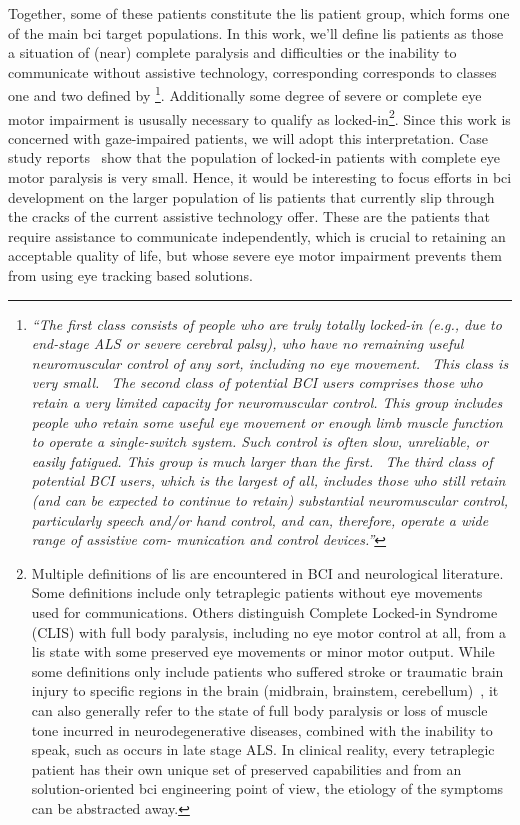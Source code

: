 \newcommand\fnlis{\footnote{
Multiple definitions of \ac{lis} are encountered in
BCI and neurological literature.
Some definitions include only tetraplegic patients without eye movements used
for communications.
Others distinguish Complete Locked-in Syndrome (CLIS) with full body paralysis,
including no eye motor control at all, from a \ac{lis} state with some preserved eye
movements or minor motor output.
While some definitions only include patients who suffered stroke or traumatic
brain injury to specific regions in the brain (midbrain, brainstem,
cerebellum)~\cite{Smith2005},
it can also generally refer to the state of full body paralysis
or loss of muscle tone incurred in neurodegenerative diseases, combined with
the inability to speak, such as occurs in late stage ALS.
In clinical reality, every tetraplegic patient has their own unique set of
preserved capabilities and from an solution-oriented \ac{bci} engineering point
of view, the etiology of the symptoms can be abstracted away.
}}

\newcommand\fnwolpawcrit{\footnote{
\it``The first class consists of people who are truly totally locked-in (e.g.,
due to end-stage ALS or severe cerebral palsy), who have no remaining
useful neuromuscular control of any sort, including no eye movement.
\elide\ This class is very small. \elide\
The second class of potential BCI users comprises those who retain
a very limited capacity for neuromuscular control. This group includes
people who retain some useful eye movement or enough limb muscle
function to operate a single-switch system. Such control is often slow,
unreliable, or easily fatigued.
This group is much larger than the first.
\elide\
The third class of potential BCI users, which is the largest of all,
includes those who still retain (and can be expected to continue to
retain) substantial neuromuscular control, particularly speech and/or
hand control, and can, therefore, operate a wide range of assistive com-
munication and control devices.''
}}


Together, some of these patients constitute the \ac{lis} patient group, which
forms one of the main \ac{bci} target populations.
In this work, we'll define \ac{lis} patients as those a situation of (near)
complete paralysis and difficulties or the inability to communicate without
assistive technology, corresponding corresponds to classes one and two defined by
\textcite{Wolpaw2006}\fnwolpawcrit.
Additionally some degree of severe or complete eye motor impairment is ususally
necessary to qualify as locked-in\fnlis.
Since this work is concerned with gaze-impaired patients, we will adopt this
interpretation.
Case study reports~\cite{Patterson1986} show that the population of locked-in
patients with complete eye motor paralysis is very small.
Hence, it would be interesting to focus efforts in \ac{bci} development on the
larger population of \ac{lis} patients that  currently slip through the cracks
of the current assistive technology offer.
These are the patients that require assistance to communicate independently,
which is crucial to retaining an acceptable quality of life, but whose severe
eye motor impairment prevents them from using eye tracking based solutions.

